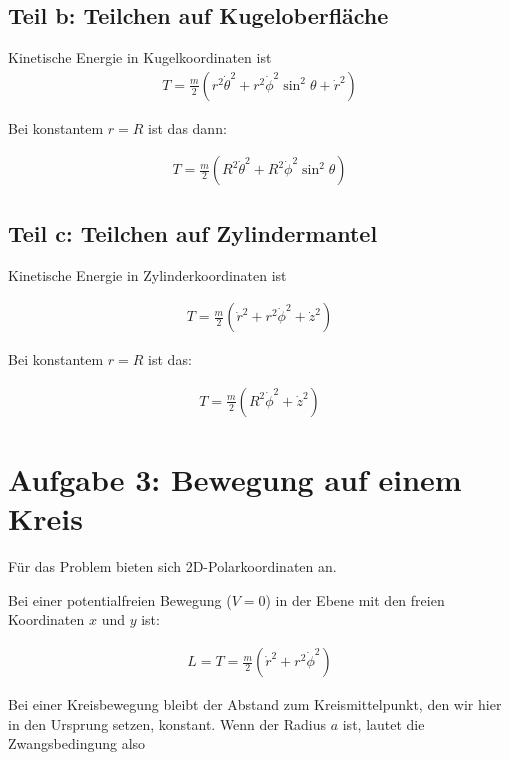 \documentclass[a4paper,german,12pt,smallheadings]{scrartcl}
\begin{document}
\subsection*{Teil b: Teilchen auf Kugeloberfläche}

Kinetische Energie in Kugelkoordinaten ist
\begin{align*}
  T = \frac{m}{2} (r^2 \dot{\theta}^2 + r^2 \dot{\phi}^2 \sin^2 \theta + \dot{r}^2)
\end{align*}

Bei konstantem $r = R$ ist das dann:

\begin{align*}
  T = \frac{m}{2} (R^2 \dot{\theta}^2 + R^2 \dot{\phi}^2 \sin^2 \theta)
\end{align*}


\subsection*{Teil c: Teilchen auf Zylindermantel}

Kinetische Energie in Zylinderkoordinaten ist

\begin{align*}
  T = \frac{m}{2} (\dot{r}^2 + r^2\dot{\phi}^2 + \dot{z}^2)
\end{align*}

Bei konstantem $r = R$ ist das:

\begin{align*}
  T = \frac{m}{2} (R^2\dot{\phi}^2 + \dot{z}^2)
\end{align*}

\section{Aufgabe 3: Bewegung auf einem Kreis}

Für das Problem bieten sich 2D-Polarkoordinaten an.

Bei einer potentialfreien Bewegung ($V=0$) in der Ebene mit den freien
Koordinaten $x$ und $y$ ist:

\begin{align*}
  L = T = \frac{m}{2} (\dot{r}^2 + r^2\dot{\phi}^2)
\end{align*}


Bei einer Kreisbewegung bleibt der Abstand zum Kreismittelpunkt, den wir hier
in den Ursprung setzen, konstant. Wenn der Radius $a$ ist, lautet die
Zwangsbedingung also
\end{document}
